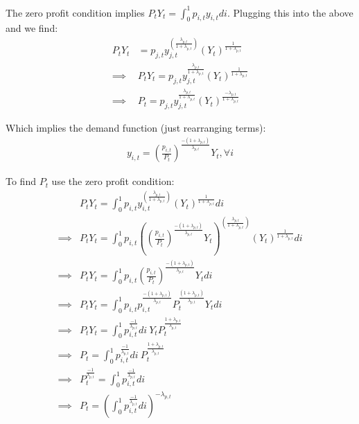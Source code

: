 \documentclass[article,11pt,letterpaper,fleqn]{article}
\theoremstyle{definition}
\numberwithin{equation}{section}
\begin{document}
{The zero profit condition implies $P_{t}Y_{t}=\int_{0}^{1}p_{i,t}y_{i,t}di$.  Plugging this into the above and we find:
\begin{equation}
\begin{split}
P_{t}Y_{t} &= p_{j,t}y_{j,t}^{\left(\frac{\lambda_{p,t}}{1+\lambda_{p,t}}\right)}(Y_{t})^{\frac{1}{1+\lambda_{p,t}}} \\
\implies &P_{t}Y_{t}=p_{j,t}y_{j,t}^{\frac{\lambda_{p,t}}{1+\lambda_{p,t}}}(Y_{t})^{\frac{1}{1+\lambda_{p,t}}} \\
\implies & P_{t} =  p_{j,t}y_{j,t}^{\frac{\lambda_{p,t}}{1+\lambda_{p,t}}}(Y_{t})^{\frac{-\lambda_{p,t}}{1+\lambda_{p,t}}}
\end{split}
\end{equation}

Which implies the demand function (just rearranging terms):
\begin{equation}
\begin{split}
y_{i,t} =  \left(\frac{p_{i,t}}{P_{t}}\right)^{\frac{-(1+\lambda_{p,t})}{\lambda_{p,t}}}Y_{t}, \forall i
\end{split}
\end{equation}

To find $P_{t}$ use the zero profit condition:
\begin{equation}
\begin{split}
& P_{t}Y_{t} = \int_{0}^{1}p_{i,t}y_{i,t}^{\left(\frac{\lambda_{p,t}}{1+\lambda_{p,t}}\right)}(Y_{t})^{\frac{1}{1+\lambda_{p,t}}}di \\
\implies & P_{t}Y_{t} = \int_{0}^{1}p_{i,t}\left(\left(\frac{p_{i,t}}{P_{t}}\right)^{\frac{-(1+\lambda_{p,t})}{\lambda_{p,t}}}Y_{t}\right)^{\left(\frac{\lambda_{p,t}}{1+\lambda_{p,t}}\right)}(Y_{t})^{\frac{1}{1+\lambda_{p,t}}}di \\
\implies & P_{t}Y_{t} = \int_{0}^{1}p_{i,t}\left(\frac{p_{i,t}}{P_{t}}\right)^{\frac{-(1+\lambda_{p,t})}{\lambda_{p,t}}}Y_{t}di \\
\implies & P_{t}Y_{t} = \int_{0}^{1}p_{i,t}p_{i,t}^{\frac{-(1+\lambda_{p,t})}{\lambda_{p,t}}}P_{t}^{\frac{(1+\lambda_{p,t})}{\lambda_{p,t}}}Y_{t}di \\
\implies & P_{t}Y_{t} = \int_{0}^{1}p_{i,t}^{\frac{-1}{\lambda_{p,t}}}di \:  Y_{t}P_{t}^{\frac{1+\lambda_{p,t}}{\lambda_{p,t}}} \\
\implies & P_{t} = \int_{0}^{1}p_{i,t}^{\frac{-1}{\lambda_{p,t}}}di \: P_{t}^{\frac{1+\lambda_{p,t}}{\lambda_{p,t}}} \\
\implies & P_{t}^{\frac{-1}{\lambda_{p,t}}} = \int_{0}^{1}p_{i,t}^{\frac{-1}{\lambda_{p,t}}}di \\
\implies & P_{t} = \left(\int_{0}^{1}p_{i,t}^{\frac{-1}{\lambda_{p,t}}}di\right)^{-\lambda_{p,t}} \\
\end{split}
\end{equation}

}
\end{document}
